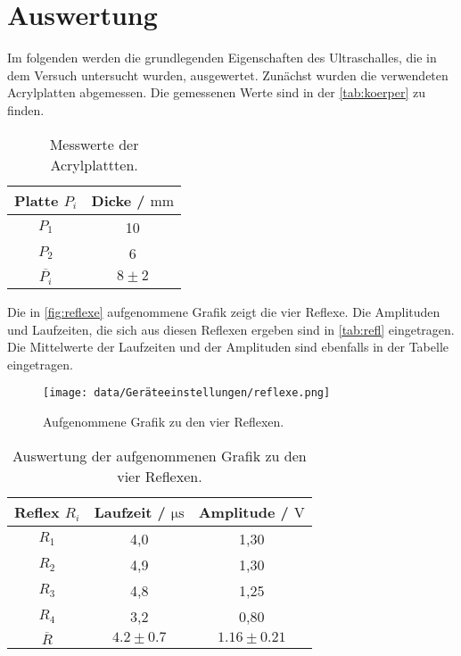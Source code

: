 \section{Auswertung}
\label{sec:Auswertung}

Im folgenden werden die grundlegenden Eigenschaften des Ultraschalles, die in dem Versuch untersucht wurden, ausgewertet. \newline
Zunächst wurden die verwendeten Acrylplatten abgemessen. Die gemessenen Werte sind in der \autoref{tab:koerper} zu finden.

\begin{table}
  \centering
  \caption{Messwerte der Acrylplattten.}
  \label{tab:koerper}
  \begin{tabular}{c c}
    \toprule
    Platte $P_i$ & Dicke / $\si{\milli\meter}$ \\
    \midrule
    $P_1$ & 10 \\
    $P_2$ & 6 \\
    $\overline{P_i}$ & $8 \pm 2$ \\
    \bottomrule
  \end{tabular}
\end{table}

Die in \autoref{fig:reflexe} aufgenommene Grafik zeigt die vier Reflexe. Die Amplituden und Laufzeiten, die sich aus diesen Reflexen ergeben sind in \autoref{tab:refl}
eingetragen. Die Mittelwerte der Laufzeiten und der Amplituden sind ebenfalls in der Tabelle eingetragen.

\begin{figure}[H]
  \centering
  \texttt{[image: data/Geräteeinstellungen/reflexe.png]}
  \caption{Aufgenommene Grafik zu den vier Reflexen.}
  \label{fig:reflexe}
\end{figure}

\begin{table}
  \centering
  \caption{Auswertung der aufgenommenen Grafik zu den vier Reflexen.}
  \label{tab:refl}
  \begin{tabular}{c c c}
    \toprule
    Reflex $R_i$ & Laufzeit / $\si{\micro\second}$ & Amplitude / $\si{\volt}$ \\
    \midrule
    $R_1$ & 4,0 & 1,30 \\
    $R_2$ & 4,9 & 1,30 \\
    $R_3$ & 4,8 & 1,25 \\
    $R_4$ & 3,2 & 0,80 \\
    $\overline R$ & $4.2 \pm 0.7$ & $1.16 \pm 0.21$ \\
    \bottomrule
  \end{tabular}
\end{table}

